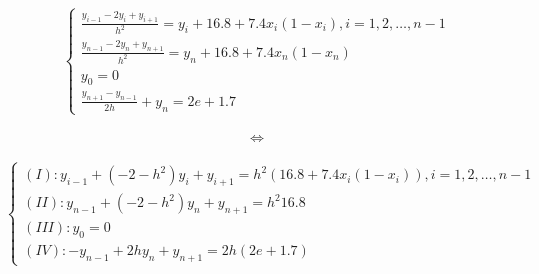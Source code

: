 \documentclass[12pt,a4paper]{article}
\begin{document}
		\[
		\begin{cases}
			\frac{y_{i-1} - 2y_{i} + y_{i+1}}{h^{2}} = y_{i} + 16.8 + 7.4x_{i}(1 - x_{i}), i = 1, 2, \dotsc, n-1\\
			\frac{y_{n-1} - 2y_{n} + y_{n+1}}{h^{2}} = y_{n} + 16.8 + 7.4x_{n}(1 - x_{n})\\
			y_{0} = 0\\
			\frac{y_{n+1} - y_{n-1}}{2h} + y_{n} = 2e + 1.7
		\end{cases}
		\]\\
		\hspace{-6mm}
		\[
		\iff
		\]\\
		\hspace{-9mm}
		\[
		\begin{cases}
			(I):     y_{i-1} + (-2 - h^{2})y_{i} + y_{i+1} = h^{2}(16.8 + 7.4x_{i}(1 - x_{i})), i = 1, 2, \dotsc, n-1\\
			(II):   y_{n-1} + (-2 - h^{2})y_{n} + y_{n+1} = h^{2}16.8\\
			(III): y_{0} = 0\\
			(IV):   -y_{n-1} + 2hy_{n} + y_{n+1} = 2h(2e + 1.7)
		\end{cases}
		\]\\
		
\end{document}
